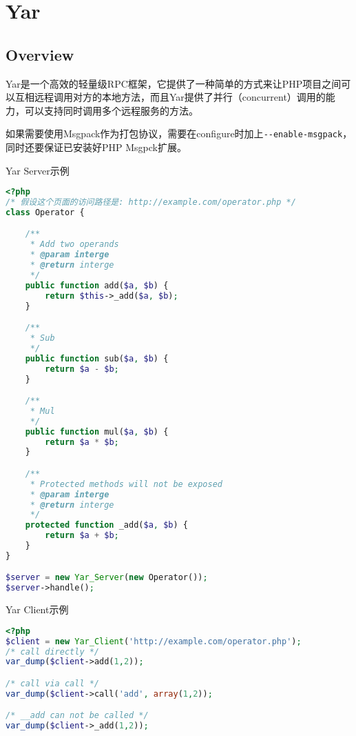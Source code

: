 \part{Yar}

\chapter{Overview}

Yar是一个高效的轻量级RPC框架，它提供了一种简单的方式来让PHP项目之间可以互相远程调用对方的本地方法，而且Yar提供了并行（concurrent）调用的能力，可以支持同时调用多个远程服务的方法。

如果需要使用Msgpack作为打包协议，需要在configure时加上\texttt{-\/-enable-msgpack}，同时还要保证已安装好PHP Msgpck扩展。

\begin{example}
Yar Server示例
\begin{lstlisting}[language=PHP]
<?php
/* 假设这个页面的访问路径是: http://example.com/operator.php */
class Operator {

    /**
     * Add two operands
     * @param interge 
     * @return interge
     */
    public function add($a, $b) {
        return $this->_add($a, $b);
    }

    /**
     * Sub 
     */
    public function sub($a, $b) {
        return $a - $b;
    }

    /**
     * Mul
     */
    public function mul($a, $b) {
        return $a * $b;
    }

    /**
     * Protected methods will not be exposed
     * @param interge 
     * @return interge
     */
    protected function _add($a, $b) {
        return $a + $b;
    }
}

$server = new Yar_Server(new Operator());
$server->handle();
\end{lstlisting}
\end{example}

\begin{figure}[htbp]
\centering

\end{figure}


\begin{example}
Yar Client示例
\begin{lstlisting}[language=PHP]
<?php
$client = new Yar_Client('http://example.com/operator.php');
/* call directly */
var_dump($client->add(1,2));

/* call via call */
var_dump($client->call('add', array(1,2));

/* __add can not be called */
var_dump($client->_add(1,2));
\end{lstlisting}
\end{example}

